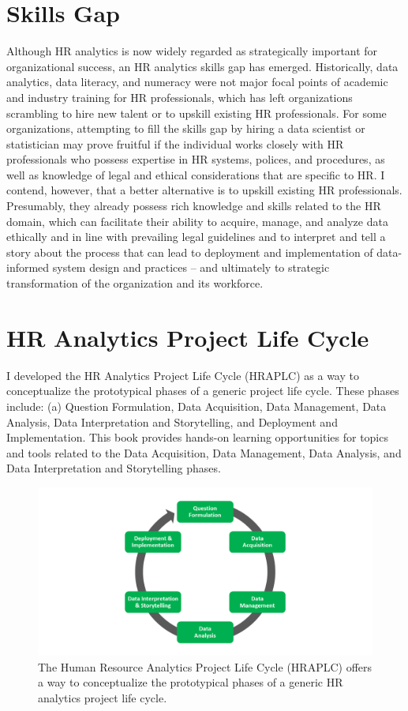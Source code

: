 \documentclass[]{book}
\begin{document}
\section{Skills Gap}\label{skills-gap}

Although HR analytics is now widely regarded as strategically important
for organizational success, an HR analytics skills gap has emerged.
Historically, data analytics, data literacy, and numeracy were not major
focal points of academic and industry training for HR professionals,
which has left organizations scrambling to hire new talent or to upskill
existing HR professionals. For some organizations, attempting to fill
the skills gap by hiring a data scientist or statistician may prove
fruitful if the individual works closely with HR professionals who
possess expertise in HR systems, polices, and procedures, as well as
knowledge of legal and ethical considerations that are specific to HR. I
contend, however, that a better alternative is to upskill existing HR
professionals. Presumably, they already possess rich knowledge and
skills related to the HR domain, which can facilitate their ability to
acquire, manage, and analyze data ethically and in line with prevailing
legal guidelines and to interpret and tell a story about the process
that can lead to deployment and implementation of data-informed system
design and practices -- and ultimately to strategic transformation of
the organization and its workforce.

\hypertarget{hraplc}{\section{HR Analytics Project Life
Cycle}\label{hraplc}}

I developed the HR Analytics Project Life Cycle (HRAPLC) as a way to
conceptualize the prototypical phases of a generic project life cycle.
These phases include: (a) Question Formulation, Data Acquisition, Data
Management, Data Analysis, Data Interpretation and Storytelling, and
Deployment and Implementation. This book provides hands-on learning
opportunities for topics and tools related to the Data Acquisition, Data
Management, Data Analysis, and Data Interpretation and Storytelling
phases.

\begin{figure}
\centering
\includegraphics{hraplc.png}
\caption{The Human Resource Analytics Project Life Cycle (HRAPLC) offers
a way to conceptualize the prototypical phases of a generic HR analytics
project life cycle.}
\end{figure}
\end{document}
